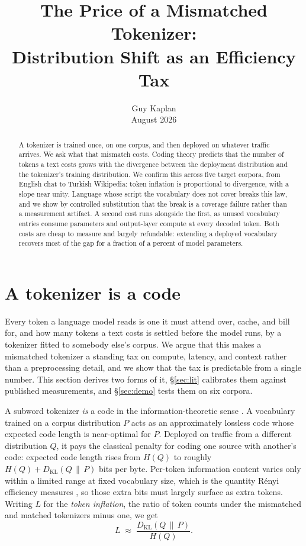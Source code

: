 \documentclass{article}
\title{The Price of a Mismatched Tokenizer:\\ Distribution Shift as an Efficiency Tax}
\author{Guy Kaplan \\
\normalfont August 2026}
\begin{document}
\maketitle

\begin{abstract}
\noindent A tokenizer is trained once, on one corpus, and then deployed on whatever traffic arrives. We ask what that mismatch costs. Coding theory predicts that the number of tokens a text costs grows with the divergence between the deployment distribution and the tokenizer's training distribution. We confirm this across five target corpora, from English chat to Turkish Wikipedia: token inflation is proportional to divergence, with a slope near unity. Language whose script the vocabulary does not cover breaks this law, and we show by controlled substitution that the break is a coverage failure rather than a measurement artifact. A second cost runs alongside the first, as unused vocabulary entries consume parameters and output-layer compute at every decoded token. Both costs are cheap to measure and largely refundable: extending a deployed vocabulary recovers most of the gap for a fraction of a percent of model parameters.
\end{abstract}

\section{A tokenizer is a code}
\label{sec:setup}

Every token a language model reads is one it must attend over, cache, and bill for, and how many tokens a text costs is settled before the model runs, by a tokenizer fitted to somebody else's corpus. We argue that this makes a mismatched tokenizer a standing tax on compute, latency, and context rather than a preprocessing detail, and we show that the tax is predictable from a single number. This section derives two forms of it, \S\ref{sec:lit} calibrates them against published measurements, and \S\ref{sec:demo} tests them on six corpora.

A subword tokenizer \emph{is} a code in the information-theoretic sense \citep{zouhar2023tokenization}. A vocabulary trained on a corpus distribution $P$ acts as an approximately lossless code whose expected code length is near-optimal for $P$. Deployed on traffic from a different distribution $Q$, it pays the classical penalty for coding one source with another's code: expected code length rises from $H(Q)$ to roughly $H(Q) + D_{\mathrm{KL}}(Q\,\|\,P)$ bits per byte. Per-token information content varies only within a limited range at fixed vocabulary size, which is the quantity R\'enyi efficiency measures \citep{zouhar2023tokenization}, so those extra bits must largely surface as extra tokens. Writing $L$ for the \emph{token inflation}, the ratio of token counts under the mismatched and matched tokenizers minus one, we get
\begin{equation}
L \;\approx\; \frac{D_{\mathrm{KL}}(Q\,\|\,P)}{H(Q)}.
\label{eq:inflation}
\end{equation}
\end{document}
